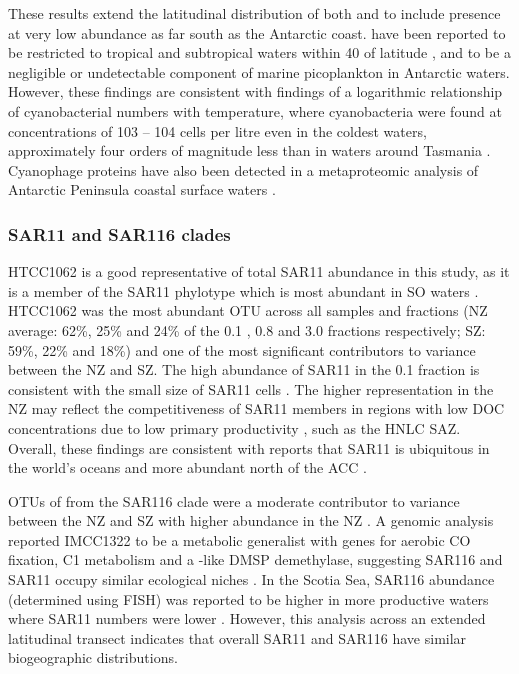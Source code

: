 These results extend the latitudinal distribution of both  and  to include presence at very low abundance as far south as the Antarctic coast.
 have been reported to be restricted to tropical and subtropical waters within 40\textdegree{} of latitude \cite{Partensky:1999uf}, and to be a negligible \cite{Ghiglione:2011ee} or undetectable \cite{Grzymski:2012ej} component of marine picoplankton in Antarctic waters.
However, these findings are consistent with findings of a logarithmic relationship of cyanobacterial numbers with temperature, where cyanobacteria were found at concentrations of 103 -- 104 cells per litre even in the coldest waters, approximately four orders of magnitude less than in waters around Tasmania \cite{Marchant:1987wv}.
Cyanophage proteins have also been detected in a metaproteomic analysis of Antarctic Peninsula coastal surface waters \cite{Williams:2012bs}.

\subsubsection{SAR11 and SAR116 clades}

 HTCC1062 is a good representative of total SAR11 abundance in this study, as it is a member of the SAR11 phylotype which is most abundant in \ac{SO} waters \cite{Brown:2012gna}.
 HTCC1062 was the most abundant \ac{OTU} across all samples and fractions (\ac{NZ} average: 62\%, 25\% and 24\% of the 0.1 \micron{}, 0.8 \micron{} and 3.0 \micron{} fractions respectively; \ac{SZ}: 59\%, 22\% and 18\%) and one of the most significant contributors to variance between the \ac{NZ} and \ac{SZ}.
The high abundance of SAR11 in the 0.1 \micron{} fraction is consistent with the small size of SAR11 cells \cite{Rappe:2002wz}.
The higher representation in the \ac{NZ} may reflect the competitiveness of SAR11 members in regions with low \ac{DOC} concentrations due to low primary productivity \cite{Giovannoni:2005ib,Alonso:2006dj}, such as the \ac{HNLC} \ac{SAZ}.
Overall, these findings are consistent with reports that SAR11 is ubiquitous in the world's oceans \cite{Mary:2006wk,Carlson:2009cc} and more abundant north of the \ac{ACC} \cite{Giebel:2009hr}.

\acp{OTU} of  from the SAR116 clade were a moderate contributor to variance between the \ac{NZ} and \ac{SZ} with higher abundance in the \ac{NZ} .
A genomic analysis reported  IMCC1322 to be a metabolic generalist with genes for aerobic CO fixation, C1 metabolism and a -like \ac{DMSP} demethylase, suggesting SAR116 and SAR11 occupy similar ecological niches \cite{Oh:2010di}.
In the Scotia Sea, SAR116 abundance (determined using \ac{FISH}) was reported to be higher in more productive waters where SAR11 numbers were lower \cite{Topping:2006ul}.
However, this analysis across an extended latitudinal transect indicates that overall SAR11 and SAR116 have similar biogeographic distributions.

